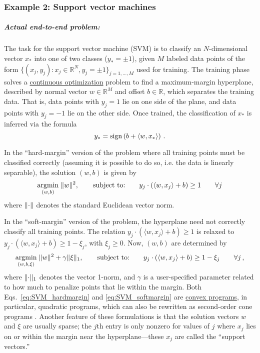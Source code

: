 \begin{refsection}
\subsubsection*{Example 2: Support vector machines}\label{sec:SVM}
%
\subparagraph{Actual end-to-end problem:}
The task for the support vector machine (SVM) is to classify an $N$-dimensional vector $x_*$ into one of two classes ($y_* = \pm 1$), given $M$ labeled data points of the form $\{(x_j,y_j): x_j\in \mathbb{R}^N, y_j=\pm 1\}_{j=1,...,M}$ used for training. The training phase solves a \hyperref[appl:ContinuousOpt]{continuous optimization} problem to find a maximum-margin hyperplane, described by normal vector $w \in \mathbb{R}^M$ and offset $b \in \mathbb{R}$, which separates the training data. That is, data points with $y_j=1$ lie on one side of the plane, and data points with $y_j=-1$ lie on the other side. Once trained, the classification of $x_*$ is inferred via the formula
\begin{equation}\label{eq:SVM_classify}
    y_*={\rm sign}\left(b+\langle w, x_*\rangle\right)\,. 
\end{equation}


In the ``hard-margin'' version of the problem where all training points must be classified correctly (assuming it is possible to do so, i.e. the data is linearly separable), the solution $(w,b)$ is given by
\begin{equation}\label{eq:SVM_hardmargin}
    \operatorname*{argmin}_{(w,b)} \; \lVert w\rVert^2, \qquad 
    \text{subject to:} \qquad  y_j \cdot (\langle w,x_j \rangle + b) \geq 1 \qquad \forall j
\end{equation}
where $\lVert\cdot\rVert$ denotes the standard Euclidean vector norm. 


In the ``soft-margin'' version of the problem, the hyperplane need not correctly classify all training points. The relation $y_j \cdot (\langle w, x_j\rangle+b) \geq 1$ is relaxed to $y_j \cdot (\langle w, x_j \rangle +b) \geq 1-\xi_j$, with $\xi_j \geq 0$. Now, $(w,b)$ are determined by
\begin{equation}\label{eq:SVM_softmargin}
    \operatorname*{argmin}_{(w,b, \xi)} \; \lVert w\rVert^2 + \gamma \lVert\xi\rVert_1, \qquad 
    \text{subject to:} \qquad  y_j \cdot (\langle w,x_j \rangle + b) \geq 1-\xi_j \qquad \forall j\,,
\end{equation}
where $\lVert\cdot\rVert_1$ denotes the vector 1-norm, and $\gamma$ is a user-specified parameter related to how much to penalize points that lie within the margin. Both Eqs.~\eqref{eq:SVM_hardmargin} and \eqref{eq:SVM_softmargin} are \hyperref[appl:ConicProgramming]{convex programs}, in particular, quadratic programs, which can also be rewritten as second-order cone programs \cite{kerenidis2019QAlgsSecondOrderConeSVM}. Another feature of these formulations is that the solution vectors $w$ and $\xi$ are usually sparse; the $j$th entry is only nonzero for values of $j$ where $x_j$ lies on or within the margin near the hyperplane---these $x_j$ are called the ``support vectors.''


\end{refsection}

